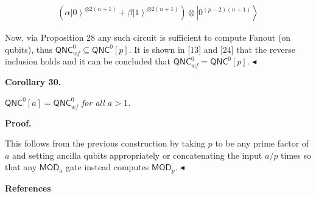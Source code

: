 \documentclass[10pt,a4paper]{article}
\begin{document}
\[\begin{gathered}
\displaystyle(\alpha\left|0\right\rangle^{\otimes 2(n+1)}+\beta\left|1\right\rangle^{\otimes 2(n+1)})\otimes\left|0^{(p-2)(n+1)}\right\rangle
\end{gathered}\]


Now, via Proposition 28 any such circuit is sufficient to compute Fanout (on qubits), thus ${\mathsf{QNC}}^{0}_{wf}\subseteq{\mathsf{QNC}}^{0}[p]$. It is shown in [13] and [24] that the reverse inclusion holds and it can be concluded that ${\mathsf{QNC}}^{0}_{wf}={\mathsf{QNC}}^{0}[p]$.
$\blacktriangleleft$\par





\par\medskip\noindent\textbf{
\textbf{Corollary 30}\textbf{.}
}\par



${\mathsf{QNC}}^{0}[a]={\mathsf{QNC}}^{0}_{wf}$\emph{ for all $a>1$.}\par







\par\medskip\noindent\textbf{Proof.}\par




This follows from the previous construction by taking $p$ to be any prime factor of $a$ and setting ancilla qubits appropriately or concatenating the input $a/p$ times so that any $\mathsf{MOD}_{a}$ gate instead computes $\mathsf{MOD}_{p}$.
$\blacktriangleleft$\par







\par\medskip\noindent\textbf{References}\par
\end{document}
